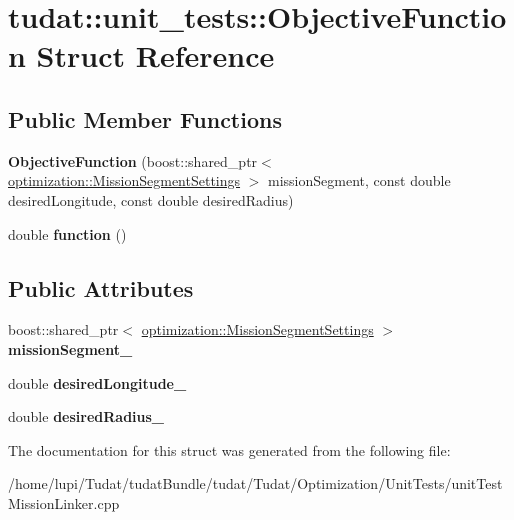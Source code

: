 \hypertarget{structtudat_1_1unit__tests_1_1ObjectiveFunction}{}\section{tudat\+:\+:unit\+\_\+tests\+:\+:Objective\+Function Struct Reference}
\label{structtudat_1_1unit__tests_1_1ObjectiveFunction}
\subsection*{Public Member Functions}
\begin{DoxyCompactItemize}
\item 
{\bfseries Objective\+Function} (boost\+::shared\+\_\+ptr$<$ \hyperlink{structtudat_1_1optimization_1_1MissionSegmentSettings}{optimization\+::\+Mission\+Segment\+Settings} $>$ mission\+Segment, const double desired\+Longitude, const double desired\+Radius)\hypertarget{structtudat_1_1unit__tests_1_1ObjectiveFunction_ad76b525b1fe75228bd2481a307da8080}{}\label{structtudat_1_1unit__tests_1_1ObjectiveFunction_ad76b525b1fe75228bd2481a307da8080}

\item 
double {\bfseries function} ()\hypertarget{structtudat_1_1unit__tests_1_1ObjectiveFunction_a0989613170a5ba34196e8e133f700f3f}{}\label{structtudat_1_1unit__tests_1_1ObjectiveFunction_a0989613170a5ba34196e8e133f700f3f}

\end{DoxyCompactItemize}
\subsection*{Public Attributes}
\begin{DoxyCompactItemize}
\item 
boost\+::shared\+\_\+ptr$<$ \hyperlink{structtudat_1_1optimization_1_1MissionSegmentSettings}{optimization\+::\+Mission\+Segment\+Settings} $>$ {\bfseries mission\+Segment\+\_\+}\hypertarget{structtudat_1_1unit__tests_1_1ObjectiveFunction_a0a3e165bdf12bd9ae69a7c9650bca4ca}{}\label{structtudat_1_1unit__tests_1_1ObjectiveFunction_a0a3e165bdf12bd9ae69a7c9650bca4ca}

\item 
double {\bfseries desired\+Longitude\+\_\+}\hypertarget{structtudat_1_1unit__tests_1_1ObjectiveFunction_a0876e7fccc371c7d85c7752ae7ff3a23}{}\label{structtudat_1_1unit__tests_1_1ObjectiveFunction_a0876e7fccc371c7d85c7752ae7ff3a23}

\item 
double {\bfseries desired\+Radius\+\_\+}\hypertarget{structtudat_1_1unit__tests_1_1ObjectiveFunction_aaf11343a7307bb6fc7520ee764a37e3b}{}\label{structtudat_1_1unit__tests_1_1ObjectiveFunction_aaf11343a7307bb6fc7520ee764a37e3b}

\end{DoxyCompactItemize}


The documentation for this struct was generated from the following file\+:\begin{DoxyCompactItemize}
\item 
/home/lupi/\+Tudat/tudat\+Bundle/tudat/\+Tudat/\+Optimization/\+Unit\+Tests/unit\+Test\+Mission\+Linker.\+cpp\end{DoxyCompactItemize}
